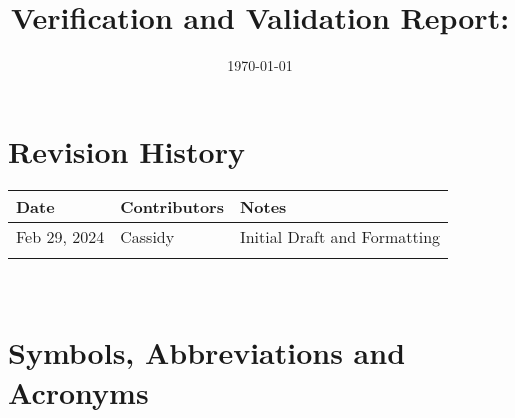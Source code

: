 \documentclass[12pt, titlepage]{article}
\begin{document}
\title{Verification and Validation Report: \progname} 
\author{\authname}
\date{\today}
	
\maketitle


\section{Revision History}

\begin{tabularx}{\textwidth}{p{3cm}p{2cm}X}
\toprule {\bf Date} & {\bf Contributors} & {\bf Notes}\\
\midrule
Feb 29, 2024 & Cassidy & Initial Draft and Formatting\\
 &  & \\
\bottomrule
\end{tabularx}

~\newpage

\section{Symbols, Abbreviations and Acronyms}
\end{document}
